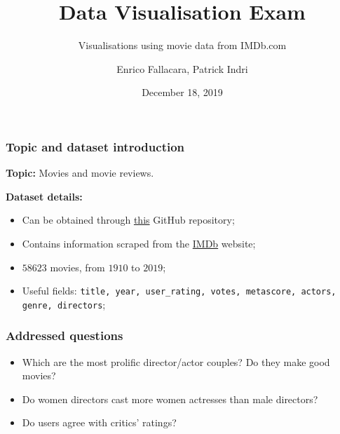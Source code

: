 \documentclass[aspectratio=169]{beamer}
\title{Data Visualisation Exam}
\subtitle{Visualisations using movie data from IMDb.com}
\author{Enrico Fallacara, Patrick Indri}
\date{December 18, 2019}
\begin{document}
  \setcounter{showSlideNumbers}{0}

  \frame{\titlepage}


  \setcounter{framenumber}{0}
  \setcounter{showSlideNumbers}{1}


  \begin{frame}
    \frametitle{Topic and dataset introduction}

    \textbf{Topic:} Movies and movie reviews.

    \vspace{1em} 

    \textbf{Dataset details:} 

    \vspace{0.5em} 

    \begin{itemize}
      \setlength\itemsep{1em}
      \item Can be obtained through \href{https://github.com/dojutsu-user/IMDB-Scraper}{this} GitHub repository;
      \item Contains information scraped from the \href{https://imdb.com}{IMDb} website;
      \item $58623$ movies, from $1910$ to $2019$;
      \item Useful fields: \texttt{title, year, user\_rating, votes, metascore, actors, genre, directors};
    \end{itemize}

    \vspace{1em} 


  \end{frame}



  \begin{frame}
    \frametitle{Addressed questions}

    \begin{itemize}
      \setlength\itemsep{1em}
      \item Which are the most prolific director/actor couples? Do they make good movies?
      \item Do women directors cast more women actresses than male directors?
      \item Do users agree with critics' ratings?
    \end{itemize}

  \end{frame}
\end{document}
